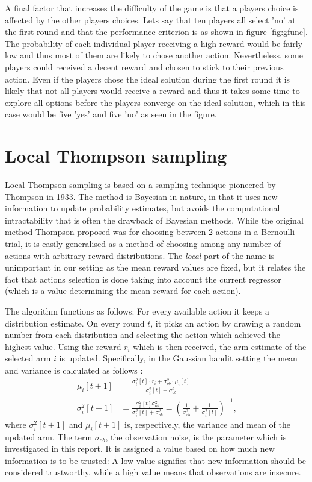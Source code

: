 A final factor that increases the difficulty of the game is that a players choice is affected by the other
players choices. Lets say that ten players all select 'no' at the first round and that the performance 
criterion is as shown in figure \ref{fig:gfunc}. The probability of
each individual player receiving a high reward would be fairly low and thus most of them
are likely to chose another action. Nevertheless, some players  could received a decent reward
and chosen to stick to their previous action. Even if the players
chose the ideal solution during the first round it is likely that not all players would
receive a reward and thus it takes some time to explore all options before the players
converge on the ideal solution, which in this case would be five 'yes' and five 'no' as seen in the figure.

\section{Local Thompson sampling}
Local Thompson sampling \cite{May2011} is based on a sampling technique pioneered by Thompson \cite{Thompson1933} in 1933. 
The method is Bayesian in nature, in that it uses new information to update probability estimates, but avoids the computational intractability that is often the drawback of Bayesian methods.
While the original method Thompson proposed was for choosing between 2 actions in a Bernoulli trial, it is easily generalised as a method of choosing among any number of actions with arbitrary reward distributions.
The \emph{local} part of the name is unimportant in our setting as the mean reward values are fixed, but it relates the fact that actions selection is done taking into account the current regressor (which is a value determining the mean reward for each action).

The algorithm functions as follows: For every available action it keeps a distribution estimate.
On every round $t$, it picks an action by drawing a random number from each distribution and selecting the action which achieved the highest value.
Using the reward $r_i$ which is then received, the arm estimate of the selected arm $i$ is updated.
Specifically, in the Gaussian bandit setting the mean and variance is calculated as follows \cite{Murphy2007}:
\begin{align*}
    \mu_i [t + 1] &= \frac{\sigma_i^2 [t] \cdot r_i + \sigma_{ob}^2 \cdot \mu_i [t]}{\sigma_i^2 [t] + \sigma_{ob}^2} \\
    \sigma_i^2 [t + 1] &= \frac{\sigma_i^2 [t] \sigma_{ob}^2}{\sigma_i^2 [t] + \sigma_{ob}^2} = \left(\frac{1}{\sigma_{ob}^2} + \frac{1}{\sigma_i^2 [t]} \right)^{-1} \text{,}
\end{align*}
where $\sigma_i^2 [t + 1]$ and $\mu_i [t + 1]$ is, respectively, the variance and mean of the updated arm.
The term $\sigma_{ob}$, the observation noise, is the parameter which is investigated in this report.
It is assigned a value based on how much new information is to be trusted: A low value signifies that new information should be considered trustworthy, while a high value means that observations are insecure.

